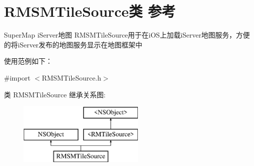 \hypertarget{interface_r_m_s_m_tile_source}{\section{R\-M\-S\-M\-Tile\-Source类 参考}
\label{interface_r_m_s_m_tile_source}
}


Super\-Map i\-Server地图 R\-M\-S\-M\-Tile\-Source用于在i\-O\-S上加载i\-Server地图服务，方便的将i\-Server发布的地图服务显示在地图框架中 \par
 使用范例如下：  




{\ttfamily \#import $<$R\-M\-S\-M\-Tile\-Source.\-h$>$}

类 R\-M\-S\-M\-Tile\-Source 继承关系图\-:\begin{figure}[H]
\begin{center}
\leavevmode
\includegraphics[height=3.000000cm]{interface_r_m_s_m_tile_source}
\end{center}
\end{figure}
